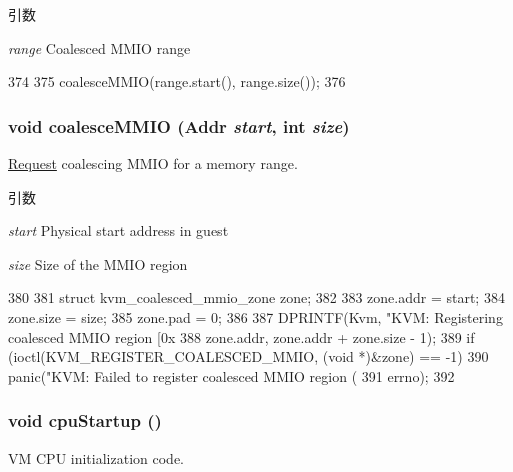 \begin{DoxyParams}{引数}
\item[{\em range}]Coalesced MMIO range \end{DoxyParams}



\begin{DoxyCode}
374 {
375     coalesceMMIO(range.start(), range.size());
376 }
\end{DoxyCode}
\hypertarget{classKvmVM_a438f7ca24f2e320af449cd86d2a70990}{
\subsubsection[{coalesceMMIO}]{\setlength{\rightskip}{0pt plus 5cm}void coalesceMMIO ({\bf Addr} {\em start}, \/  int {\em size})}}
\label{classKvmVM_a438f7ca24f2e320af449cd86d2a70990}
\hyperlink{classRequest}{Request} coalescing MMIO for a memory range.


\begin{DoxyParams}{引数}
\item[{\em start}]Physical start address in guest \item[{\em size}]Size of the MMIO region \end{DoxyParams}



\begin{DoxyCode}
380 {
381     struct kvm_coalesced_mmio_zone zone;
382 
383     zone.addr = start;
384     zone.size = size;
385     zone.pad = 0;
386 
387     DPRINTF(Kvm, "KVM: Registering coalesced MMIO region [0x%
388             zone.addr, zone.addr + zone.size - 1);
389     if (ioctl(KVM_REGISTER_COALESCED_MMIO, (void *)&zone) == -1)
390         panic("KVM: Failed to register coalesced MMIO region (%
391               errno);
392 }
\end{DoxyCode}
\hypertarget{classKvmVM_a0161816a71e88927cba137fb4dde7298}{
\subsubsection[{cpuStartup}]{\setlength{\rightskip}{0pt plus 5cm}void cpuStartup ()}}
\label{classKvmVM_a0161816a71e88927cba137fb4dde7298}
VM CPU initialization code.

